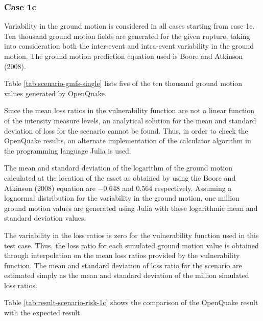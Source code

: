 \subsubsection{Case 1c}
Variability in the ground motion is considered in all cases starting from case 1c. Ten thousand ground motion fields are generated for the given rupture, taking into consideration both the inter-event and intra-event variability in the ground motion. The ground motion prediction equation used is Boore and Atkinson (2008).



Table \ref{tab:scenario-gmfs-single} lists five of the ten thousand ground motion values generated by OpenQuake.

Since the mean loss ratios in the vulnerability function are not a linear function of the intensity measure levels, an analytical solution for the mean and standard deviation of loss for the scenario cannot be found. Thus, in order to check the OpenQuake results, an alternate implementation of the calculator algorithm in the programming language Julia is used.

The mean and standard deviation of the logarithm of the ground motion calculated at the location of the asset as obtained by using the Boore and Atkinson (2008) equation are $-0.648$ and $0.564$ respectively. Assuming a lognormal distribution for the variability in the ground motion, one million ground motion values are generated using Julia with these logarithmic mean and standard deviation values.

The variability in the loss ratios is zero for the vulnerability function used in this test case. Thus, the loss ratio for each simulated ground motion value is obtained through interpolation on the mean loss ratios provided by the vulnerability function. The mean and standard deviation of loss ratio for the scenario are estimated simply as the mean and standard deviation of the million simulated loss ratios.



Table \ref{tab:result-scenario-risk-1c} shows the comparison of the OpenQuake result with the expected result.